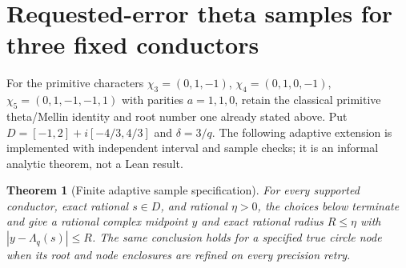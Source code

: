 \documentclass[11pt]{article}
\newtheorem{theorem}{Theorem}[section]
\theoremstyle{definition}\newtheorem{definition}[theorem]{Definition}
\theoremstyle{remark}\newtheorem{remark}[theorem]{Remark}
\begin{document}
\section{Requested-error theta samples for three fixed conductors}\label{at:sampling}
For the primitive characters $\chi_3=(0,1,-1)$, $\chi_4=(0,1,0,-1)$,
$\chi_5=(0,1,-1,-1,1)$ with parities $a=1,1,0$, retain the classical
primitive theta/Mellin identity and root number one already stated above.
Put $D=[-1,2]+i[-4/3,4/3]$ and $\delta=3/q$.
The following adaptive extension is implemented with independent interval
and sample checks; it is an informal analytic theorem, not a Lean result.
\begin{theorem}[Finite adaptive sample specification]\label{at:sample}
For every supported conductor, exact rational $s\in D$, and rational
$\eta>0$, the choices below terminate and give a rational complex midpoint
$y$ and exact rational radius $R\le\eta$ with
$|y-\Lambda_q(s)|\le R$.
The same conclusion holds for a specified true circle node when its
root and node enclosures are refined on every precision retry.
\end{theorem}
\end{document}
